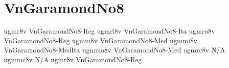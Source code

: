 \documentclass[sample]{vnsample}
\begin{document}
\section{VnGaramondNo8}
  {ugmr8v}   {VnGaramondNo8-Reg}
 {ugmri8v}  {VnGaramondNo8-Ita}
 {ugmro8v}  {VnGaramondNo8-Reg}
  {ugmm8v}   {VnGaramondNo8-Med}
 {ugmmi8v}  {VnGaramondNo8-MedIta}
 {ugmmo8v}  {VnGaramondNo8-Med}
 {ugmrc8v}  {N/A}
 {ugmmc8v}  {N/A}
  {ugmr8v}   {VnGaramondNo8-Reg}
\end{document}
